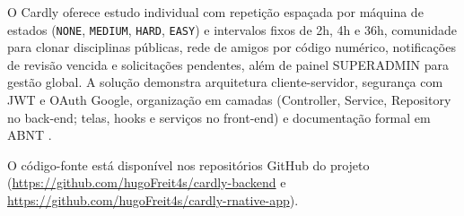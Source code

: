 O Cardly oferece estudo individual com repetição espaçada por máquina de estados (\texttt{NONE}, \texttt{MEDIUM}, \texttt{HARD}, \texttt{EASY}) e intervalos fixos de 2h, 4h e 36h, comunidade para clonar disciplinas públicas, rede de amigos por código numérico, notificações de revisão vencida e solicitações pendentes, além de painel SUPERADMIN para gestão global. A solução demonstra arquitetura cliente-servidor, segurança com JWT e OAuth Google, organização em camadas (Controller, Service, Repository no back-end; telas, hooks e serviços no front-end) e documentação formal em ABNT \cite{abnt_nbr14724,jwt_io,google_oauth}.

O código-fonte está disponível nos repositórios GitHub do projeto (\url{https://github.com/hugoFreit4s/cardly-backend} e \url{https://github.com/hugoFreit4s/cardly-rnative-app}).
